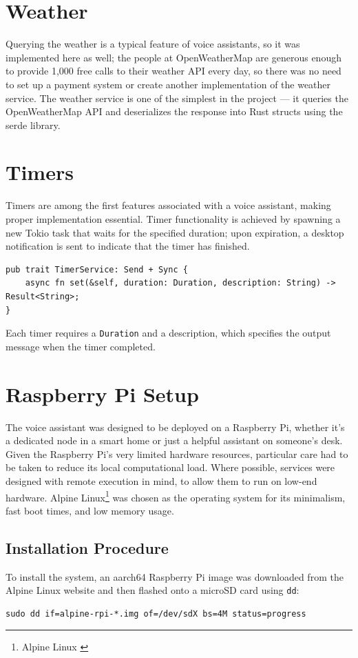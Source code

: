 \section{Weather}
Querying the weather is a typical feature of voice assistants, so it was implemented here as well;
the people at OpenWeatherMap are generous enough to provide 1,000 free calls to their weather API every day,
so there was no need to set up a payment system or create another implementation of the weather service.
The weather service is one of the simplest in the project --- it queries the OpenWeatherMap API
and deserializes the response into Rust structs using the serde library.

\section{Timers}
Timers are among the first features associated with a voice assistant, making proper implementation essential.
Timer functionality is achieved by spawning a new Tokio task that waits for the specified duration;
upon expiration, a desktop notification is sent to indicate that the timer has finished.

\begin{verbatim}
pub trait TimerService: Send + Sync {
    async fn set(&self, duration: Duration, description: String) -> Result<String>;
}
\end{verbatim}
Each timer requires a \texttt{Duration} and a description,
which specifies the output message when the timer completed.

\section{Raspberry Pi Setup}
The voice assistant was designed to be deployed on a Raspberry Pi,
whether it's a dedicated node in a smart home or just a helpful assistant on someone's desk.
Given the Raspberry Pi's very limited hardware resources,
particular care had to be taken to reduce its local computational load.
Where possible, services were designed with remote execution in mind,
to allow them to run on low-end hardware.
Alpine Linux\footnote{Alpine Linux \cite{alpine}}
was chosen as the operating system for its minimalism, fast boot times, and low memory usage.

\subsection{Installation Procedure}
To install the system, an aarch64 Raspberry Pi image was downloaded from the Alpine Linux website
and then flashed onto a microSD card using \texttt{dd}:
\begin{verbatim}
sudo dd if=alpine-rpi-*.img of=/dev/sdX bs=4M status=progress
\end{verbatim}

